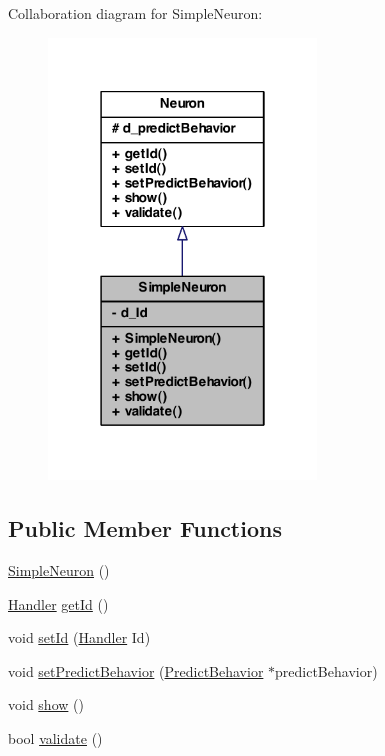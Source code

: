 Collaboration diagram for SimpleNeuron:
\nopagebreak
\begin{figure}[H]
\begin{center}
\leavevmode
\includegraphics[width=202pt]{class_simple_neuron__coll__graph}
\end{center}
\end{figure}
\subsection*{Public Member Functions}
\begin{DoxyCompactItemize}
\item 
\hyperlink{class_simple_neuron_a38c2d75287caf6374c1252c35f73dce2}{SimpleNeuron} ()
\item 
\hyperlink{_a_m_o_r_e_8h_abc871abb71cff6655b8172ee7240b8ef}{Handler} \hyperlink{class_simple_neuron_a2ed8cdd977472afaecca2c6b27c6beef}{getId} ()
\item 
void \hyperlink{class_simple_neuron_a7330de5a6a79925b950f78a65c529297}{setId} (\hyperlink{_a_m_o_r_e_8h_abc871abb71cff6655b8172ee7240b8ef}{Handler} Id)
\item 
void \hyperlink{class_simple_neuron_a2f30831cc6f0fd2d4180269ce3fb3346}{setPredictBehavior} (\hyperlink{class_predict_behavior}{PredictBehavior} $\ast$predictBehavior)
\item 
void \hyperlink{class_simple_neuron_afea22112336409283a5bb7d281f7f4bd}{show} ()
\item 
bool \hyperlink{class_simple_neuron_a9e7173abb892281d0b2ffb0efc82f0e5}{validate} ()
\end{DoxyCompactItemize}
